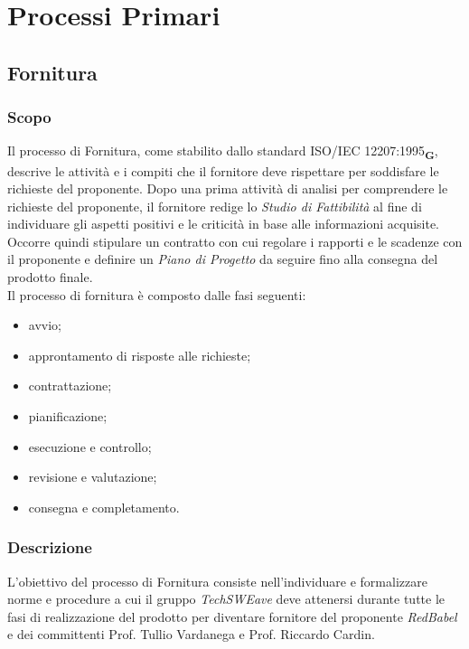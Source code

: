 \section{Processi Primari}
\subsection{Fornitura}
\subsubsection{Scopo}
Il processo di Fornitura, come stabilito dallo standard ISO/IEC 12207:1995\textsubscript{\textbf{G}}, descrive le attività e i compiti che il fornitore deve rispettare per soddisfare le richieste del proponente. Dopo una prima attività di analisi per comprendere le richieste del proponente, il fornitore redige lo \textit{Studio di Fattibilità} al fine di individuare gli aspetti positivi e le criticità in base alle informazioni acquisite. Occorre quindi stipulare un contratto con cui regolare i rapporti e le scadenze con il proponente e definire un \textit{Piano di Progetto} da seguire fino alla consegna del prodotto finale.
\\Il processo di fornitura è composto dalle fasi seguenti:
\begin{itemize}
    \item avvio;
    \item approntamento di risposte alle richieste;
    \item contrattazione;
    \item pianificazione;
    \item esecuzione e controllo;
    \item revisione e valutazione;
    \item consegna e completamento.
\end{itemize}
\subsubsection{Descrizione}
L’obiettivo del processo di Fornitura consiste nell’individuare e formalizzare norme e procedure a cui il gruppo \textit{TechSWEave} deve attenersi durante tutte le fasi di realizzazione del prodotto per diventare fornitore del proponente \textit{RedBabel} e dei committenti Prof. Tullio Vardanega e Prof. Riccardo Cardin.

